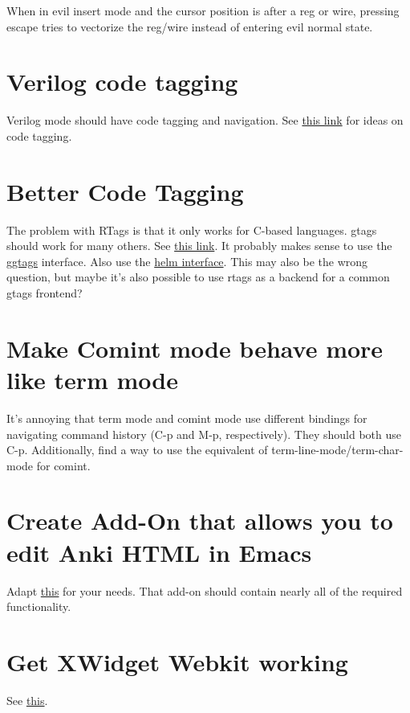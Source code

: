 \documentclass{default}
\begin{document}
When in evil insert mode and the cursor position is after a reg or wire, pressing escape tries to
vectorize the reg/wire instead of entering evil normal state.

\section{Verilog code tagging}

Verilog mode should have code tagging and navigation. See
\href{https://scripter.co/ctags-systemverilog-and-emacs/}{this link} for ideas on code tagging.

\section{Better Code Tagging}

The problem with RTags is that it only works for C-based languages. gtags should work for many
others. See \href{https://tuhdo.github.io/c-ide.html}{this link}. It probably makes sense to use the
\href{https://github.com/leoliu/ggtags}{ggtags} interface. Also use the
\href{https://github.com/syohex/emacs-helm-gtags/}{helm interface}. This may also be the wrong
question, but maybe it's also possible to use rtags as a backend for a common gtags frontend?

\section{Make Comint mode behave more like term mode}

It's annoying that term mode and comint mode use different bindings for navigating command history
(C-p and M-p, respectively). They should both use C-p. Additionally, find a way to use the
equivalent of term-line-mode/term-char-mode for comint.

\section{Create Add-On that allows you to edit Anki HTML in Emacs}

Adapt \href{https://github.com/louietan/anki-editor}{this} for your needs. That add-on should
contain nearly all of the required functionality.

\section{Get XWidget Webkit working}

See \href{https://emacsnotes.wordpress.com/2018/08/18/why-a-minimal-browser-when-there-is-a-full-featured-one-introducingxwidget-webkit-a-state-of-the-art-browser-for-your-modern-emacs/}{this}.
\end{document}
